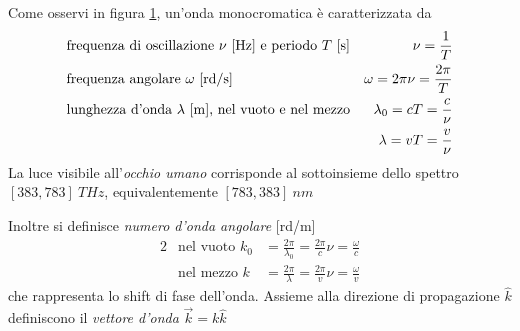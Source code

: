 \begin{figure}[t]
	\label{chapter1:spectrum}
\end{figure}
%
Come osservi in figura \ref{chapter1:spectrum}, un'onda monocromatica \`e caratterizzata da
\begin{alignat}{2}
	&\text{frequenza di oscillazione $\nu$ [\si{Hz}] e periodo $T$ [\si{s}]} & \nu = \frac{1}{T} \\
	&\text{frequenza angolare $\omega$ [\si{rd/s}]} & \omega = 2\pi\nu = \frac{2\pi}{T} \\
	&\text{lunghezza d'onda $\lambda$ [\si{m}], nel vuoto e nel mezzo} & \lambda_0 = cT = \frac{c}{\nu} \\
	& & \lambda = vT = \frac{v}{\nu}
\end{alignat}
La luce visibile all'\textit{occhio umano} corrisponde al sottoinsieme dello spettro $[383, 783]\ \si{THz}$, equivalentemente $[783, 383]\ \si{nm}$\par
Inoltre si definisce \textit{numero d'onda angolare} [\si{rd/m}]
\begin{alignat}{2}
	& \text{nel vuoto } k_0 &= \frac{2\pi}{\lambda_0} = \frac{2\pi}{c}\nu = \frac{\omega}{c} \\
	& \text{nel mezzo }  k &= \frac{2\pi}{\lambda} = \frac{2\pi}{v}\nu = \frac{\omega}{v}
\end{alignat}
che rappresenta lo shift di fase dell'onda. 
Assieme alla direzione di propagazione $\hat{k}$ definiscono il \textit{vettore d'onda} $\overrightarrow{k} = k \hat{k}$\par
